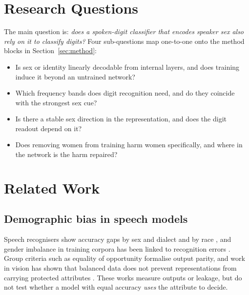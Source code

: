 \documentclass[conference]{IEEEtran}
\begin{document}
\section{Research Questions}\label{sec:rq}

The main question is: \emph{does a spoken-digit classifier that encodes
speaker sex also rely on it to classify digits?} Four sub-questions map
one-to-one onto the method blocks in Section~\ref{sec:method}:
\begin{itemize}
  \item[\textbf{RQ1}] Is sex or identity linearly decodable from internal
        layers, and does training induce it beyond an untrained network?
  \item[\textbf{RQ2}] Which frequency bands does digit recognition need, and do
        they coincide with the strongest sex cue?
  \item[\textbf{RQ3}] Is there a stable sex direction in the representation,
        and does the digit readout depend on it?
  \item[\textbf{RQ4}] Does removing women from training harm women
        specifically, and where in the network is the harm repaired?
\end{itemize}

\section{Related Work}\label{sec:related}

\subsection{Demographic bias in speech models}
Speech recognisers show accuracy gaps by sex and dialect
\cite{tatman2017gender} and by race \cite{koenecke2020racial}, and gender
imbalance in training corpora has been linked to recognition errors
\cite{garnerin2019gender}. Group criteria such as equality of opportunity
\cite{hardt2016equality} formalise output parity, and work in vision has shown
that balanced data does not prevent representations from carrying protected
attributes \cite{wang2019balanced}. These works measure outputs or leakage,
but do not test whether a model with equal accuracy \emph{uses} the attribute
to decide.
\end{document}
